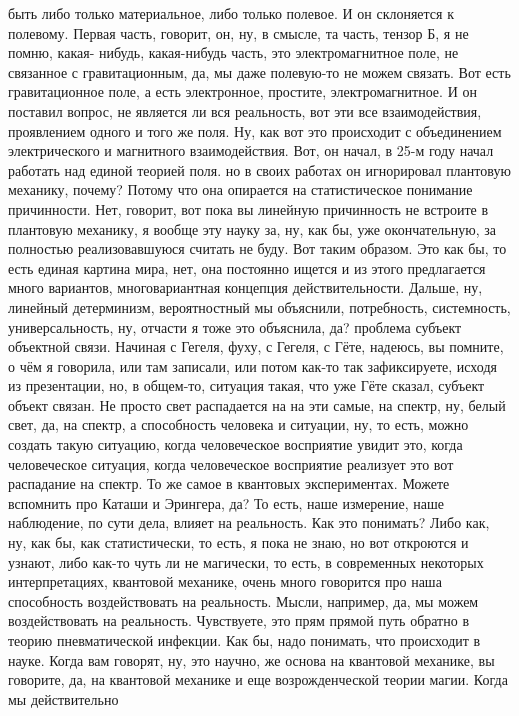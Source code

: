 быть либо только материальное, либо только полевое. И он склоняется к полевому.
Первая часть, говорит, он, ну, в смысле, та часть, тензор Б, я не помню, какая-
нибудь, какая-нибудь часть, это электромагнитное поле, не связанное с
гравитационным, да, мы даже полевую-то не можем связать. Вот есть гравитационное
поле, а есть электронное, простите, электромагнитное. И он поставил вопрос, не
является ли вся реальность, вот эти все взаимодействия, проявлением одного и
того же поля. Ну, как вот это происходит с объединением электрического и
магнитного взаимодействия. Вот, он начал, в 25-м году начал работать над единой
теорией поля. но в своих работах он игнорировал плантовую механику, почему?
Потому что она опирается на статистическое понимание причинности. Нет, говорит,
вот пока вы линейную причинность не встроите в плантовую механику, я вообще эту
науку за, ну, как бы, уже окончательную, за полностью реализовавшуюся считать не
буду. Вот таким образом. Это как бы, то есть единая картина мира, нет, она
постоянно ищется и из этого предлагается много вариантов, многовариантная
концепция действительности. Дальше, ну, линейный детерминизм, вероятностный мы
объяснили, потребность, системность, универсальность, ну, отчасти я тоже это
объяснила, да? проблема субъект объектной связи. Начиная с Гегеля, фуху, с
Гегеля, с Гёте, надеюсь, вы помните, о чём я говорила, или там записали, или
потом как-то так зафиксируете, исходя из презентации, но, в общем-то, ситуация
такая, что уже Гёте сказал, субъект объект связан. Не просто свет распадается на
на эти самые, на спектр, ну, белый свет, да, на спектр, а способность человека и
ситуации, ну, то есть, можно создать такую ситуацию, когда человеческое
восприятие увидит это, когда человеческое ситуация, когда человеческое
восприятие реализует это вот распадание на спектр. То же самое в квантовых
экспериментах. Можете вспомнить про Каташи и Эрингера, да? То есть, наше
измерение, наше наблюдение, по сути дела, влияет на реальность. Как это
понимать? Либо как, ну, как бы, как статистически, то есть, я пока не знаю, но
вот откроются и узнают, либо как-то чуть ли не магически, то есть, в современных
некоторых интерпретациях, квантовой механике, очень много говорится про наша
способность воздействовать на реальность. Мысли, например, да, мы можем
воздействовать на реальность. Чувствуете, это прям прямой путь обратно в теорию
пневматической инфекции. Как бы, надо понимать, что происходит в науке. Когда
вам говорят, ну, это научно, же основа на квантовой механике, вы говорите, да,
на квантовой механике и еще возрожденческой теории магии. Когда мы действительно
